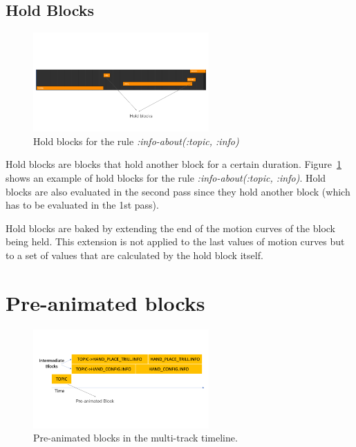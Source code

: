 \documentclass[../../main.tex]{subfiles}
\begin{document}
\subsection{Hold Blocks}
\label{ch:multi_track:second_pass:hold_blocks}

\begin{figure}[H]
    \centering
    \includegraphics[width=0.6\textwidth]{chapters/multi_track/images/hold_blocks.png}
    \caption{Hold blocks for the rule \emph{:info-about(:topic, :info)}}
    \label{fig:hold_blocks}
\end{figure}

Hold blocks are blocks that hold another block for a certain duration. Figure~\ref{fig:hold_blocks} shows an example of hold blocks for the rule \emph{:info-about(:topic, :info)}. Hold blocks are also evaluated in the second pass since they hold another block (which has to be evaluated in the 1st pass).

Hold blocks are baked by extending the end of the motion curves of the block being held. This extension is not applied to the last values of motion curves but to a set of values that are calculated by the hold block itself.

\section{Pre-animated blocks}
\label{ch:multi_track:preanim_blocks}

\begin{figure}[H]
    \centering
    \includegraphics[width=0.6\textwidth]{chapters/multi_track/images/preanim_blocks.png}
    \caption{Pre-animated blocks in the multi-track timeline.}
    \label{fig:preanim_blocks}
\end{figure}
\end{document}
